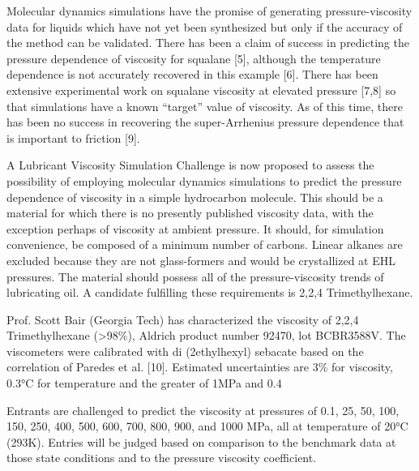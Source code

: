 \documentclass[preprint,review,12pt]{elsarticle}
\begin{document}
	Molecular dynamics simulations have the promise of generating pressure-viscosity data for liquids which have not yet been synthesized but only if the accuracy of the method can be validated.  There has been a claim of success in predicting the pressure dependence of viscosity for squalane [5], although the temperature dependence is not accurately recovered in this example [6]. There has been extensive experimental work on squalane viscosity at elevated pressure [7,8] so that simulations have a known “target” value of viscosity. As of this time, there has been no success in recovering the super-Arrhenius pressure dependence that is important to friction [9].
	
	A Lubricant Viscosity Simulation Challenge is now proposed to assess the possibility of employing molecular dynamics simulations to predict the pressure dependence of viscosity in a simple hydrocarbon molecule.  This should be a material for which there is no presently published viscosity data, with the exception perhaps of viscosity at ambient pressure. It should, for simulation convenience, be composed of a minimum number of carbons.  Linear alkanes are excluded because they are not glass-formers and would be crystallized at EHL pressures.  The material should possess all of the pressure-viscosity trends of lubricating oil.  A candidate fulfilling these requirements is 2,2,4 Trimethylhexane.
		
	Prof. Scott Bair (Georgia Tech) has characterized the viscosity of 2,2,4 Trimethylhexane (>98\%), Aldrich product number 92470, lot BCBR3588V.  The viscometers were calibrated with di (2ethylhexyl) sebacate based on the correlation of Paredes et al. [10].  Estimated uncertainties are 3\% for viscosity, 0.3°C for temperature and the greater of 1MPa and 0.4%
	
	Entrants are challenged to predict the viscosity at pressures of 0.1, 25, 50, 100, 150, 250, 400, 500, 600, 700, 800, 900, and 1000 MPa, all at temperature of 20°C (293K).  Entries will be judged based on comparison to the benchmark data at those state conditions and to the pressure viscosity coefficient.
	
\end{document}
